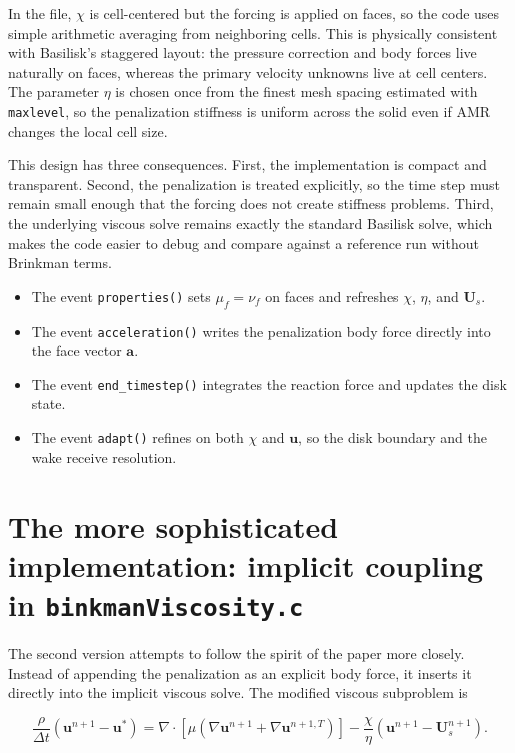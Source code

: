 \documentclass[11pt,a4paper]{article}
\begin{document}
In the file, $\chi$ is cell-centered but the forcing is applied on faces, so the code uses simple arithmetic averaging from neighboring cells. This is physically consistent with Basilisk's staggered layout: the pressure correction and body forces live naturally on faces, whereas the primary velocity unknowns live at cell centers. The parameter $\eta$ is chosen once from the finest mesh spacing estimated with \texttt{maxlevel}, so the penalization stiffness is uniform across the solid even if AMR changes the local cell size.

This design has three consequences. First, the implementation is compact and transparent. Second, the penalization is treated explicitly, so the time step must remain small enough that the forcing does not create stiffness problems. Third, the underlying viscous solve remains exactly the standard Basilisk solve, which makes the code easier to debug and compare against a reference run without Brinkman terms.

\begin{itemize}[leftmargin=1.8em]
\item The event \texttt{properties()} sets $\mu_f=\nu_f$ on faces and refreshes $\chi$, $\eta$, and $\bm{U}_s$.
\item The event \texttt{acceleration()} writes the penalization body force directly into the face vector $\bm{a}$.
\item The event \texttt{end\_timestep()} integrates the reaction force and updates the disk state.
\item The event \texttt{adapt()} refines on both $\chi$ and $\bm{u}$, so the disk boundary and the wake receive resolution.
\end{itemize}

\section{The more sophisticated implementation: implicit coupling in \texttt{binkmanViscosity.c}}

The second version attempts to follow the spirit of the paper more closely. Instead of appending the penalization as an explicit body force, it inserts it directly into the implicit viscous solve. The modified viscous subproblem is

\begin{equation}
\frac{\rho}{\Delta t}(\bm{u}^{n+1}-\bm{u}^{*}) = \nabla\cdot\left[\mu\left(\nabla\bm{u}^{n+1}+\nabla\bm{u}^{n+1,T}\right)\right] - \frac{\chi}{\eta}(\bm{u}^{n+1}-\bm{U}_s^{n+1}).
\end{equation}
\end{document}

